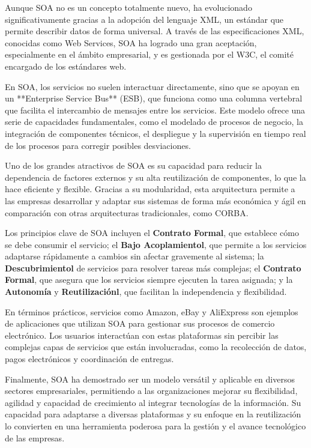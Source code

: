 \documentclass[10pt]{article}
\begin{document}
     Aunque SOA no es un concepto totalmente nuevo, ha evolucionado significativamente gracias a la adopción del lenguaje XML, un estándar que permite describir datos de forma universal. A través de las especificaciones XML, conocidas como Web Services, SOA ha logrado una gran aceptación, especialmente en el ámbito empresarial, y es gestionada por el W3C, el comité encargado de los estándares web.
     \newpage

    En SOA, los servicios no suelen interactuar directamente, sino que se apoyan en un **Enterprise Service Bus** (ESB), que funciona como una columna vertebral que facilita el intercambio de mensajes entre los servicios. Este modelo ofrece una serie de capacidades fundamentales, como el modelado de procesos de negocio, la integración de componentes técnicos, el despliegue y la supervisión en tiempo real de los procesos para corregir posibles desviaciones.
    
    Uno de los grandes atractivos de SOA es su capacidad para reducir la dependencia de factores externos y su alta reutilización de componentes, lo que la hace eficiente y flexible. Gracias a su modularidad, esta arquitectura permite a las empresas desarrollar y adaptar sus sistemas de forma más económica y ágil en comparación con otras arquitecturas tradicionales, como CORBA.
    
    Los principios clave de SOA incluyen el \textbf{{Contrato Formal}}, que establece cómo se debe consumir el servicio; el \textbf{{Bajo Acoplamientol}}, que permite a los servicios adaptarse rápidamente a cambios sin afectar gravemente al sistema; la \textbf{{Descubrimientol}} de servicios para resolver tareas más complejas; el \textbf{{Contrato Formal}}, que asegura que los servicios siempre ejecuten la tarea asignada; y la \textbf{{Autonomía}} y \textbf{{Reutilizaciónl}}, que facilitan la independencia y flexibilidad.
    
    En términos prácticos, servicios como Amazon, eBay y AliExpress son ejemplos de aplicaciones que utilizan SOA para gestionar sus procesos de comercio electrónico. Los usuarios interactúan con estas plataformas sin percibir las complejas capas de servicios que están involucradas, como la recolección de datos, pagos electrónicos y coordinación de entregas.
    
    Finalmente, SOA ha demostrado ser un modelo versátil y aplicable en diversos sectores empresariales, permitiendo a las organizaciones mejorar su flexibilidad, agilidad y capacidad de crecimiento al integrar tecnologías de la información. Su capacidad para adaptarse a diversas plataformas y su enfoque en la reutilización lo convierten en una herramienta poderosa para la gestión y el avance tecnológico de las empresas.
\end{document}

